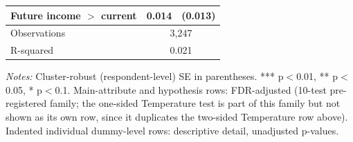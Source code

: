 \begin{table}[H]
\begin{tabular}{ l c c }
\hspace{0.05cm} Future income $>$ current & 0.014 & (0.013) \\
\hline
\hspace{0.05cm} Observations & \multicolumn{2}{c}{3,247} \\
\hspace{0.05cm} R-squared & \multicolumn{2}{c}{0.021} \\
\hline \hline
\end{tabular}
\begin{tablenotes}
\small
\item \textit{Notes:} Cluster-robust (respondent-level) SE in parentheses. *** p$<$0.01, ** p$<$0.05, * p$<$0.1. Main-attribute and hypothesis rows: FDR-adjusted (10-test pre-registered family; the one-sided Temperature test is part of this family but not shown as its own row, since it duplicates the two-sided Temperature row above). Indented individual dummy-level rows: descriptive detail, unadjusted p-values.
\end{tablenotes}
    \label{tab:table3}
\end{table}

